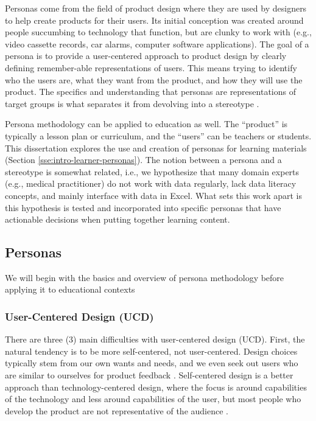 \documentclass[010-intro.tex]{subfiles}
\begin{document}
Personas come from the field of product design
where they are used by designers to help create products for their users.
Its initial conception was created around people succumbing to technology that
function, but are clunky to work with
(e.g., video cassette records, car alarms, computer software applications).
The goal of a persona is to provide a user-centered approach to product design
by clearly defining remember-able representations of users.
This means trying to identify who the users are,
what they want from the product, and
how they will use the product.
The specifics and understanding that personas are representations of target groups
is what separates it from devolving into a stereotype
\cite{pruittPersonaLifecycleKeeping2006}.

Persona methodology can be applied to education as well.
The ``product'' is typically a lesson plan or curriculum,
and the ``users'' can be teachers
\cite{zagallo2019through}
or students.
This dissertation explores the use and creation of personas for learning materials
(Section \ref{sse:intro-learner-personas}).
The notion between a persona and a stereotype is somewhat related,
i.e., we hypothesize that many domain experts (e.g., medical practitioner)
do not work with data regularly,
lack data literacy concepts,
and mainly interface with data in Excel.
What sets this work apart is this hypothesis is tested and incorporated into specific
personas that have actionable decisions when putting together learning content.

\subsection{Personas}

We will begin with the basics and overview of persona methodology
before applying it to educational contexts

    \subsubsection{User-Centered Design (UCD)}

        There are three (3) main difficulties with user-centered design (UCD).
        First,
        the natural tendency is to be more self-centered, not user-centered.
            Design choices typically stem from our own wants and needs,
            and we even seek out users who are similar to ourselves for product feedback
            \cite{pruittPersonaLifecycleKeeping2006, tognazziniTogSoftwareDesign1748}.
            Self-centered design is a better approach than technology-centered design,
            where the focus is around capabilities of the technology and less around capabilities of the user,
            but most people who develop the product are not representative of the audience
            \cite{pruittPersonaLifecycleKeeping2006}.
\end{document}
